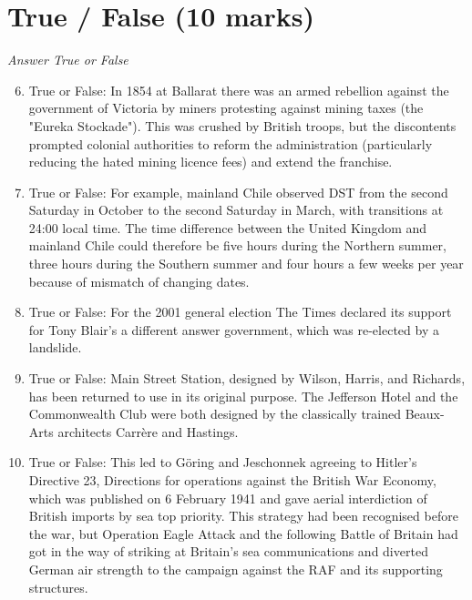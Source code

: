 \documentclass[12pt]{article}
\begin{document}
\section*{True / False (10 marks)}
\textit{Answer True or False}
\begin{enumerate}[label=\arabic*.]
\setcounter{enumi}{5}
\item True or False: In 1854 at Ballarat there was an armed rebellion against the government of Victoria by miners protesting against mining taxes (the "Eureka Stockade"). This was crushed by British troops, but the discontents prompted colonial authorities to reform the administration (particularly reducing the hated mining licence fees) and extend the franchise.
\item True or False: For example, mainland Chile observed DST from the second Saturday in October to the second Saturday in March, with transitions at 24:00 local time. The time difference between the United Kingdom and mainland Chile could therefore be five hours during the Northern summer, three hours during the Southern summer and four hours a few weeks per year because of mismatch of changing dates.
\item True or False: For the 2001 general election The Times declared its support for Tony Blair's a different answer government, which was re-elected by a landslide.
\item True or False: Main Street Station, designed by Wilson, Harris, and Richards, has been returned to use in its original purpose. The Jefferson Hotel and the Commonwealth Club were both designed by the classically trained Beaux-Arts architects Carrère and Hastings.
\item True or False: This led to Göring and Jeschonnek agreeing to Hitler's Directive 23, Directions for operations against the British War Economy, which was published on 6 February 1941 and gave aerial interdiction of British imports by sea top priority. This strategy had been recognised before the war, but Operation Eagle Attack and the following Battle of Britain had got in the way of striking at Britain's sea communications and diverted German air strength to the campaign against the RAF and its supporting structures.
\end{enumerate}
\end{document}
